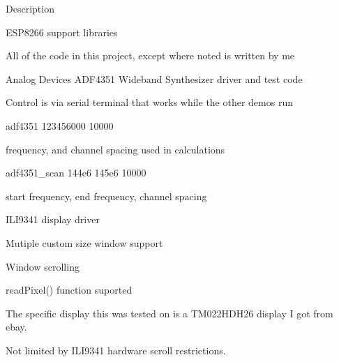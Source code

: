 \begin{DoxyParagraph}{Description}

\begin{DoxyItemize}
\item E\+S\+P8266 support libraries
\begin{DoxyItemize}
\item All of the code in this project, except where noted is written by me
\item Analog Devices A\+D\+F4351 Wideband Synthesizer driver and test code
\begin{DoxyItemize}
\item Control is via serial terminal that works while the other demos run
\item adf4351 123456000 10000
\begin{DoxyItemize}
\item frequency, and channel spacing used in calculations
\end{DoxyItemize}
\item adf4351\+\_\+scan 144e6 145e6 10000
\begin{DoxyItemize}
\item start frequency, end frequency, channel spacing
\end{DoxyItemize}
\end{DoxyItemize}
\item I\+L\+I9341 display driver
\begin{DoxyItemize}
\item Mutiple custom size window support
\item Window scrolling
\item read\+Pixel() function suported
\item The specific display this was tested on is a T\+M022\+H\+D\+H26 display I got from ebay.
\item Not limited by I\+L\+I9341 hardware scroll restrictions.
\end{DoxyItemize}
\end{DoxyItemize}
\end{DoxyItemize}
\end{DoxyParagraph}

